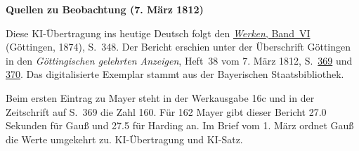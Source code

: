 \clearpage\thispagestyle{empty}
\begin{center}\textbf{Quellen zu Beobachtung (7. März 1812)}\end{center}
\noindent Diese KI-Übertragung ins heutige Deutsch folgt den \href{https://gdz.sub.uni-goettingen.de/id/PPN236007467}{\textit{Werken}, Band~VI} (Göttingen, 1874), S.~348. Der Bericht erschien unter der Überschrift Göttingen in den \textit{Göttingischen gelehrten Anzeigen}, Heft~38 vom 7. März 1812, S.~\href{https://api.digitale-sammlungen.de/iiif/image/v2/bsb10538681_00413/full/1600,/0/default.jpg}{369} und \href{https://api.digitale-sammlungen.de/iiif/image/v2/bsb10538681_00414/full/1600,/0/default.jpg}{370}. Das digitalisierte Exemplar stammt aus der Bayerischen Staatsbibliothek.
\par\smallskip\noindent Beim ersten Eintrag zu Mayer steht in der Werkausgabe 16c und in der Zeitschrift auf S.~369 die Zahl 160. Für 162 Mayer gibt dieser Bericht 27.0 Sekunden für Gauß und 27.5 für Harding an. Im Brief vom 1. März ordnet Gauß die Werte umgekehrt zu. KI-Übertragung und KI-Satz.
\clearpage

